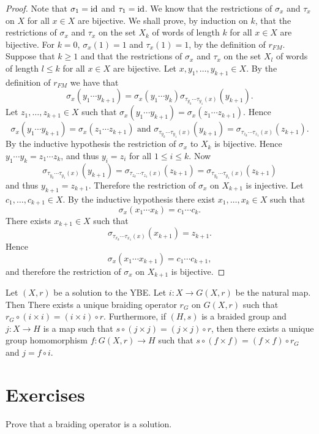 \begin{proof}
Note that $\sigma_1=\operatorname{id}$ and $\tau_1=\operatorname{id}$. We know that the restrictions of $\sigma_x$ and $\tau_x$ on $X$ for all $x\in X$ are bijective.
We shall prove, by induction on $k$, that the restrictions of $\sigma_x$ and $\tau_x$ on the set $X_k$ of words of length $k$ for all $x\in X$ are bijective. For $k=0$, $\sigma_x(1)=1$ and $\tau_x(1)=1$, by the definition of $r_{FM}$. Suppose that $k\geq 1$ and that the restrictions of $\sigma_x$ and $\tau_x$ on the set $X_l$ of words of length $l\leq k$ for all $x\in X$ are bijective. Let $x,y_1,\dots ,y_{k+1}\in X$. By the definition of $r_{FM}$ we have that
\[\sigma_x(y_1\cdots y_{k+1})=\sigma_x(y_1\cdots y_k)\sigma_{\tau_{y_k}\cdots \tau_{y_1}(x)}(y_{k+1}).\]
Let $z_1,\dots,z_{k+1}\in X$  such that $\sigma_x(y_1\cdots y_{k+1})=\sigma_x(z_1\cdots z_{k+1})$. Hence
\[\sigma_x(y_1\cdots y_{k+1})=\sigma_x(z_1\cdots z_{k+1}) \text{ and }
\sigma_{\tau_{y_k}\cdots \tau_{y_1}(x)}(y_{k+1})=\sigma_{\tau_{z_k}\cdots \tau_{z_1}(x)}(z_{k+1}).\]
By the inductive hypothesis the restriction of $\sigma_x$ to $X_k$ is bijective. Hence $y_1\cdots y_k=z_1\cdots z_k$, and thus $y_i=z_i$ for all $1\leq i\leq k$. Now
\[\sigma_{\tau_{y_k}\cdots \tau_{y_1}(x)}(y_{k+1})=\sigma_{\tau_{z_k}\cdots \tau_{z_1}(x)}(z_{k+1})=\sigma_{\tau_{y_k}\cdots \tau_{y_1}(x)}(z_{k+1})\]
and thus $y_{k+1}=z_{k+1}$. Therefore the restriction of $\sigma_x$ on $X_{k+1}$ is injective. Let $c_1,\dots ,c_{k+1}\in X$. By the inductive hypothesis there exist $x_1,\dots ,x_k\in X$ such that
\[\sigma_x(x_1\cdots x_k)=c_1\cdots c_k.\]
There exists $x_{k+1}\in X$ such that
\[\sigma_{\tau_{x_k}\cdots \tau_{x_1}(x)}(x_{k+1})=z_{k+1}.\]
Hence
\[\sigma_x(x_1\cdots x_{k+1})=c_1\cdots c_{k+1},\]
and therefore the restriction of $\sigma_x$ on $X_{k+1}$ is bijective.




\end{proof}

\begin{theorem}
\label{thm:LYZ9}
Let $(X,r)$ be a solution to the YBE. Let $i\colon X\rightarrow G(X,r)$ be the natural map. Then There exists a unique braiding operator $r_G$ on $G(X,r)$ such that $r_G\circ (i\times i)=(i\times i)\circ r$. Furthermore, if $(H,s)$ is a braided group and $j\colon X\rightarrow H$ is a map such that
$s\circ (j\times j)=(j\times j)\circ r$, then there exists a unique group homomorphism $f\colon G(X,r)\rightarrow H$ such that $s\circ (f\times f)=(f\times f)\circ r_G$ and $j=f\circ i$.
\end{theorem}

\section*{Exercises}

\begin{prob}
Prove that a braiding operator is a solution. 
\end{prob}

